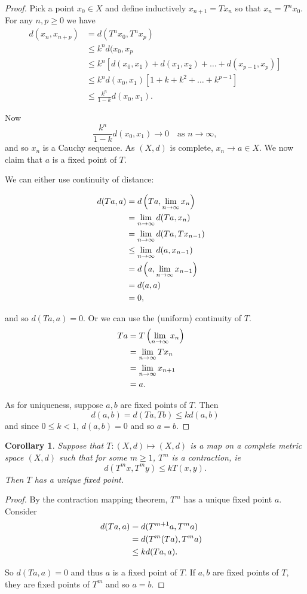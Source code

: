 \documentclass{notes}
\theoremstyle{plain}
\newtheorem{corollary}[proposition]{Corollary}
\begin{document}
\begin{proof}
Pick a point $ x_{0} \in X $ and define inductively
$x_{n+1} = Tx_{n}$ so that $x_{n}=T^{n}x_{0}$.
For any $ n,p \geq 0 $ we have
\begin{align*}
d(x_{n},x_{n+p}) & = d(T^{n}x_{0}, T^{n}x_{p}) \\
& \leq k^{n}d(x_{0},x_{p} \\
& \leq k^{n}[ d(x_{0},x_{1}) + d(x_{1},x_{2}) + \ldots + 
d(x_{p-1},x_{p})] \\
& \leq k^{n} d(x_{0},x_{1})[1+k+k^{2}+\ldots+k^{p-1}] \\
& \leq \frac{k^{n}}{1-k}d(x_{0},x_{1}).
\end{align*}

Now \[ \frac{k^{n}}{1-k}d(x_{0},x_{1}) \to 0 \quad \text{as }
n \to \infty, \] 
and so $ x_{n} $ is a Cauchy sequence.
As $ (X,d) $ is complete, $ x_{n} \to a \in X $.
We now claim that $ a $ is a fixed point of $ T $.

We can either use continuity of distance:

\begin{align*}
d(Ta,a) & = d \left(Ta, \lim_{n \to \infty}x_{n} \right) \cr
& = \lim_{n \to \infty}d(Ta,x_{n}) \cr
& = \lim_{n \to \infty}d(Ta,Tx_{n-1}) \cr
& \leq \lim_{n \to \infty} d(a,x_{n-1}) \cr
& = d \left( a, \lim_{n \to \infty}x_{n-1} \right) \cr
& = d(a,a) \cr
& = 0,
\end{align*}

and so $ d(Ta,a)=0 $.
Or we can use the (uniform) continuity of $ T $.
\begin{align*}
Ta & = T \left( \lim_{n \to \infty} x_{n} \right) \cr
& = \lim_{n \to \infty}Tx_{n} \cr
& = \lim_{n \to \infty}x_{n+1} \cr
& = a.
\end{align*}

As for uniqueness, suppose $ a,b $ are fixed points of $ T $.
Then \[ d(a,b) = d(Ta,Tb) \leq k d(a,b) \] and since $ 0 \leq k < 1 
$, $ d(a,b)=0 $ and so $ a=b $.
\end{proof}

\begin{corollary}
Suppose that $ T\colon (X,d) \mapsto (X,d) $ is a map on a complete 
metric space $ (X,d) $ such that for some $ m \geq 1 $, $ T^{m} $ 
is a contraction, ie \[ d(T^{m}x,T^{m}y) \leq k T(x,y). \] Then $ T 
$ has a unique fixed point.
\end{corollary}

\begin{proof}
By the contraction mapping theorem, $ T^{m} $ has a unique fixed 
point $ a $.  Consider 
\begin{align*}
d(Ta,a) & = d(T^{m+1}a, T^{m}a) \cr
& = d(T^{m}(Ta), T^{m}a) \cr
& \leq k d(Ta,a).
\end{align*}

So $ d(Ta,a) =0 $ and thus $ a $ is a fixed point of $ T $.
If $ a,b $ are fixed points of $ T $, they are fixed points of $ 
T^{m} $ and so $ a=b $.
\end{proof}
\end{document}
